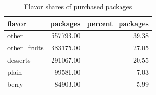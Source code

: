 \begin{table}
\caption{Flavor shares of purchased packages}
\begin{tabular}{lrr}
\toprule
flavor & packages & percent\_packages \\
\midrule
other & 557793.00 & 39.38 \\
other\_fruits & 383175.00 & 27.05 \\
desserts & 291067.00 & 20.55 \\
plain & 99581.00 & 7.03 \\
berry & 84903.00 & 5.99 \\
\bottomrule
\end{tabular}
\end{table}
